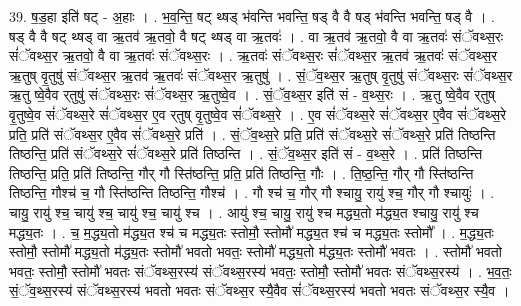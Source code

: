 \documentclass[17pt]{extarticle}
\begin{document}
39. ष॒ड॒हा इति॑ षट् - अ॒हाः । . भ॒व॒न्ति॒ षट् थ्षड् भ॑वन्ति भवन्ति॒ षड् वै वै षड् भ॑वन्ति भवन्ति॒ षड् वै । . षड् वै वै षट् थ्षड् वा ऋ॒तव॑ ऋ॒तवो॒ वै षट् थ्षड् वा ऋ॒तवः॑ । . वा ऋ॒तव॑ ऋ॒तवो॒ वै वा ऋ॒तवः॑ संॅवथ्स॒रः सं॑ॅवथ्स॒र ऋ॒तवो॒ वै वा ऋ॒तवः॑ संॅवथ्स॒रः । . ऋ॒तवः॑ संॅवथ्स॒रः सं॑ॅवथ्स॒र ऋ॒तव॑ ऋ॒तवः॑ संॅवथ्स॒र ऋ॒तुष् वृ॒तुषु॑ संॅवथ्स॒र ऋ॒तव॑ ऋ॒तवः॑ संॅवथ्स॒र ऋ॒तुषु॑ । . सं॒ॅव॒थ्स॒र ऋ॒तुष् वृ॒तुषु॑ संॅवथ्स॒रः सं॑ॅवथ्स॒र ऋ॒तु ष्वे॒वैव र्‌तुषु॑ संॅवथ्स॒रः सं॑ॅवथ्स॒र ऋ॒तुष्वे॒व । . सं॒ॅव॒थ्स॒र इति॑ सं - व॒थ्स॒रः । . ऋ॒तु ष्वे॒वैव र्‌तुष् वृ॒तुष्वे॒व सं॑ॅवथ्स॒रे सं॑ॅवथ्स॒र ए॒व र्‌तुष् वृ॒तुष्वे॒व सं॑ॅवथ्स॒रे । . ए॒व सं॑ॅवथ्स॒रे सं॑ॅवथ्स॒र ए॒वैव सं॑ॅवथ्स॒रे प्रति॒ प्रति॑ संॅवथ्स॒र ए॒वैव सं॑ॅवथ्स॒रे प्रति॑ । . सं॒ॅव॒थ्स॒रे प्रति॒ प्रति॑ संॅवथ्स॒रे सं॑ॅवथ्स॒रे प्रति॑ तिष्ठन्ति तिष्ठन्ति॒ प्रति॑ संॅवथ्स॒रे सं॑ॅवथ्स॒रे प्रति॑ तिष्ठन्ति । . सं॒ॅव॒थ्स॒र इति॑ सं - व॒थ्स॒रे । . प्रति॑ तिष्ठन्ति तिष्ठन्ति॒ प्रति॒ प्रति॑ तिष्ठन्ति॒ गौर् गौ स्ति॑ष्ठन्ति॒ प्रति॒ प्रति॑ तिष्ठन्ति॒ गौः । . ति॒ष्ठ॒न्ति॒ गौर् गौ स्ति॑ष्ठन्ति तिष्ठन्ति॒ गौश्च॑ च॒ गौ स्ति॑ष्ठन्ति तिष्ठन्ति॒ गौश्च॑ । . गौ श्च॑ च॒ गौर् गौ श्चायु॒ रायु॑ श्च॒ गौर् गौ श्चायुः॑ । . चायु॒ रायु॑ श्च॒ चायु॑ श्च॒ चायु॑ श्च॒ चायु॑ श्च । . आयु॑ श्च॒ चायु॒ रायु॑ श्च मद्ध्य॒तो म॑द्ध्य॒त श्चायु॒ रायु॑ श्च मद्ध्य॒तः । . च॒ म॒द्ध्य॒तो म॑द्ध्य॒त श्च॑ च मद्ध्य॒तः स्तोमौ॒ स्तोमौ॑ मद्ध्य॒त श्च॑ च मद्ध्य॒तः स्तोमौ᳚ । . म॒द्ध्य॒तः स्तोमौ॒ स्तोमौ॑ मद्ध्य॒तो म॑द्ध्य॒तः स्तोमौ॑ भवतो भवतः॒ स्तोमौ॑ मद्ध्य॒तो म॑द्ध्य॒तः स्तोमौ॑ भवतः । . स्तोमौ॑ भवतो भवतः॒ स्तोमौ॒ स्तोमौ॑ भवतः संॅवथ्स॒रस्य॑ संॅवथ्स॒रस्य॑ भवतः॒ स्तोमौ॒ स्तोमौ॑ भवतः संॅवथ्स॒रस्य॑ । . भ॒व॒तः॒ सं॒ॅव॒थ्स॒रस्य॑ संॅवथ्स॒रस्य॑ भवतो भवतः संॅवथ्स॒र स्यै॒वैव सं॑ॅवथ्स॒रस्य॑ भवतो भवतः संॅवथ्स॒र स्यै॒व । \newline
\end{document}
